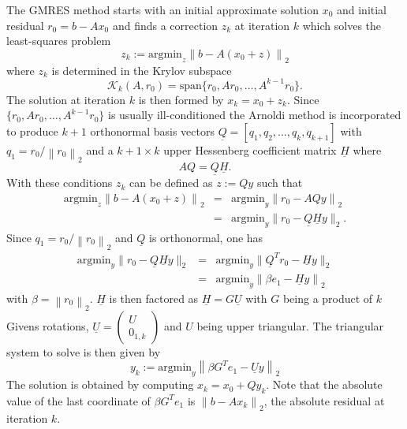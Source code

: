 \documentclass{scrartcl}
\newcommand{\norm}[1]{\left\lVert#1\right\rVert}
\begin{document}
The GMRES method starts with an initial approximate solution $x_0$ and initial residual $r_0 = b - Ax_0$ and finds a correction $z_k$ at iteration $k$ which solves the least-squares problem 
\begin{equation}
	z_k := \text{argmin}_{z} \norm{b - A(x_0 + z)}_2
\end{equation}
where $z_k$ is determined in the Krylov subspace 
\begin{equation*}
	 \mathcal{K}_k(A, r_0) = \text{span}\{r_0, Ar_0, \ldots, A^{k-1}r_0\}.
\end{equation*}
The solution at iteration $k$ is then formed by $x_k = x_0 + z_k$.
Since $\{r_0, Ar_0, \ldots, A^{k-1}r_0\}$ is usually ill-conditioned the Arnoldi method is incorporated to produce $k + 1$ orthonormal basis vectors $\underline{Q} = [q_1, q_2, \ldots, q_k, q_{k + 1}]$ with $q_1 = r_0/\norm{r_0}_2$ and a $k + 1 \times k$ upper Hessenberg coefficient matrix $\underline{H}$ where
\begin{equation*}
	AQ = \underline{Q}\underline{H}.
\end{equation*}
With these conditions $z_k$ can be defined as $z := Qy$ such that 
\begin{eqnarray*}
	\text{argmin}_{z} \norm{b - A(x_0 + z)}_2 &=& \text{argmin}_y \norm{r_0 - AQy}_2 \\
	 &=& \text{argmin}_{y} \lVert r_0 - \underline{Q} \underline{H} y \rVert_2.
\end{eqnarray*}
Since $q_1 = r_0/\norm{r_0}_2$ and $\underline{Q}$ is orthonormal, one has
\begin{eqnarray} \label{eq:stdgmreslsp}
	\text{argmin}_y \lVert r_0 - \underline{Q} \underline{H} y \rVert_2 &=& \text{argmin}_{y} \lVert \underline{Q}^T r_0 - \underline{H} y \rVert_2 \nonumber \\
	&=& \text{argmin}_{y} \norm{\beta e_1 - \underline{H} y}_2 
\end{eqnarray}
with $\beta = \norm{r_0}_2$.
$\underline{H}$ is then factored as $\underline{H} = G\underline{U}$ with $G$ being a product of $k$ Givens rotations, $\underline{U} = 
\begin{pmatrix}
	U \\
	0_{1, k}
\end{pmatrix}$
and $U$ being upper triangular. The triangular system to solve is then given by
\begin{equation*}
	y_k := \text{argmin}_y \norm{\beta G^T e_1 - \underline{U} y}_2
\end{equation*}
The solution is obtained by computing $x_k = x_0 + Qy_k$. Note that the absolute value of the last coordinate of $\beta G^T e_1$ is $\norm{b - Ax_k}_2$, the absolute residual at iteration $k$. \\
\end{document}
